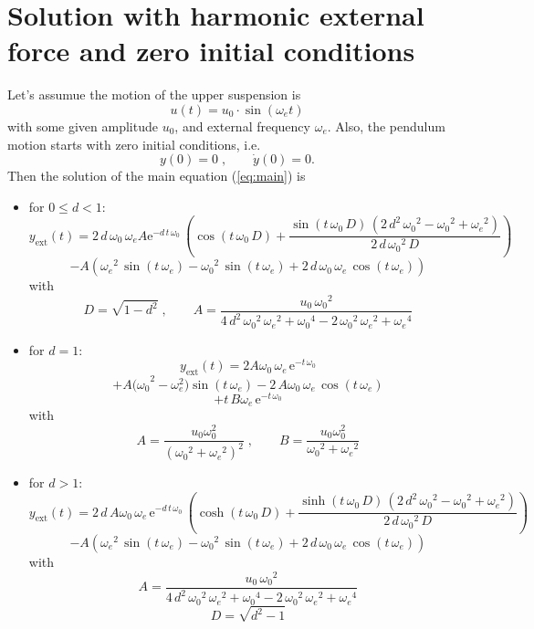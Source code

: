 \documentclass[paper=A4, pagesize, 12pt]{article}
\begin{document}
\section{Solution with harmonic external force and zero initial conditions}
Let's assumue the motion of the upper suspension is
\[
u(t) = u_0 \cdot \sin(\omega_e t)
\]
with some given amplitude $u_0$, and external
frequency $\omega_e$.
Also, the pendulum motion starts with zero initial conditions,
i.e.
\[
y(0) = 0\; , \qquad \dot{y}(0) = 0.
\]
Then the solution of the main equation (\ref{eq:main}) is
\begin{itemize}
  \item for $0\leq d<1$:
  \[
  y_{\text{ext}}(t) =
  2\, d\, \omega_0\, \omega_e A
      \mathrm{e}^{-
        d\, t\, \omega_0}\, \left(\cos\!\left(t\, \omega_0\, D \right)
        + \frac{\sin\!\left(t\, \omega_0\, D \right)\, \left(2\, d^2\, {\omega_0}^2 - {\omega_0}^2
            + {\omega_e}^2\right)}{2\, d\, {\omega_0}^2\, D } \right)
      \]
      \[
      - A
        \left({\omega_e}^2\, \sin\!\left(t\, \omega_e\right) -
          {\omega_0}^2\, \sin\!\left(t\, \omega_e\right) + 2\, d\,
          \omega_0\, \omega_e\, \cos\!\left(t\,
            \omega_e\right)\right)
      \]
      with
      \[
      D = \sqrt{1-d^2}\; , \qquad
      A =  \frac{u_0\, {\omega_0}^2}{4\, d^2\, {\omega_0}^2\, {\omega_e}^2 +
        {\omega_0}^4 - 2\, {\omega_0}^2\, {\omega_e}^2 +
        {\omega_e}^4}
      \]
      \item for $d=1$:
      \[
      y_{\text{ext}}(t) =
      2A \omega_0\, \omega_e\, \mathrm{e}^{- t\,
          \omega_0}
      \]
      \[
      +
      A {(\omega_0}^2 - \omega_e^2) \sin\!\left(t\,
          \omega_e\right)  -2\, A {\omega_0}\, \omega_e\,
        \cos\!\left(t\, \omega_e\right)
      \]
      \[
      + t\, B
        \omega_e\, \mathrm{e}^{- t\,
          \omega_0}
      \]
      with
      \[
      A = \frac{u_0 \omega_0^2}{({\omega_0}^2 + {\omega_e}^2)^2}\; , \qquad
      B = \frac{u_0 \omega_0^2}{{\omega_0}^2 + {\omega_e}^2}
      \]


      \item for $d>1$:
      \[
      y_{\text{ext}}(t) =
      2\, d\, A{\omega_0}\, \omega_e\, \mathrm{e}^{-
        d\, t\, \omega_0}\, \left(\cosh\!\left(t\, \omega_0\, D \right)
        + \frac{\sinh\!\left(t\, \omega_0\, D\right)\, \left(2\, d^2\,
            {\omega_0}^2 - {\omega_0}^2 +
            {\omega_e}^2\right)}{2\, d\, {\omega_0}^2\, D}\right)
      \]
      \[
      - A
        \left({\omega_e}^2\, \sin\!\left(t\, \omega_e\right) -
          {\omega_0}^2\, \sin\!\left(t\, \omega_e\right) + 2\, d\,
          \omega_0\, \omega_e\, \cos\!\left(t\,
            \omega_e\right)\right)
      \]
      with
      \[
      A = \frac{u_0\, {\omega_0}^2}{4\, d^2\, {\omega_0}^2\,
        {\omega_e}^2 + {\omega_0}^4 - 2\, {\omega_0}^2\,
        {\omega_e}^2 + {\omega_e}^4}
      \]
      \[
      D = \sqrt{d^2 - 1}
      \]


\end{itemize}
\end{document}
